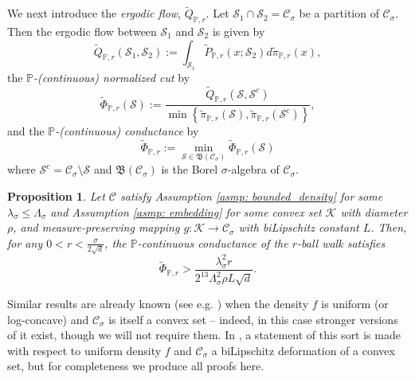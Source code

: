 \documentclass{article}
\newcommand{\set}[1]{\left\{#1\right\}}
\newcommand{\1}{\mathbf{1}}
\newcommand{\Pbb}{\mathbb{P}}
\newcommand{\Sset}{\mathcal{S}}
\newcommand{\Cset}{\mathcal{C}}
\newcommand{\Csig}{\Cset_{\sigma}}
\newcommand{\piwt}{\widetilde{\pi}}
\theoremstyle{aldenthm}
\newtheorem{proposition}{Proposition}
\theoremstyle{aldenrmrk}
\begin{document}
We next introduce the \emph{ergodic flow}, $\widetilde{Q}_{\Pbb,r}$. Let $\Sset_1 \cap \Sset_2 = \Csig$ be a partition of $\Csig$. Then the ergodic flow between $\Sset_1$ and $\Sset_2$ is given by 
\begin{equation*}
\widetilde{Q}_{\Pbb,r}(\Sset_1, \Sset_2) := \int_{\Sset_1} \widetilde{P}_{\Pbb,r}(x; \Sset_2) d\piwt_{\Pbb,r}(x), 
\end{equation*}
the \emph{$\Pbb$-(continuous) normalized cut} by
\begin{equation*}
\widetilde{\Phi}_{\Pbb,r}(\Sset) := \frac{\widetilde{Q}_{\Pbb,r}(\Sset, \Sset^c)}{\min \set{\piwt_{\Pbb,r}(\Sset),\piwt_{\Pbb,r}(\Sset^c)}},
\end{equation*}
and the \emph{$\Pbb$-(continuous) conductance} by
\begin{equation*}
\widetilde{\Phi}_{\Pbb,r} := \min_{\Sset \in \mathfrak{B}(\Csig)} \widetilde{\Phi}_{\Pbb,r}(\Sset)
\end{equation*}
where $\Sset^c = \Csig \setminus \Sset$ and $\mathfrak{B}(\Csig)$ is the Borel $\sigma$-algebra of $\Csig$. 

\begin{proposition}
	\label{prop: nonuniform_continuous_conductance}
	Let $\Cset$ satisfy Assumption \ref{asmp: bounded_density} for some $\lambda_{\sigma} \leq \Lambda_{\sigma}$ and Assumption \ref{asmp: embedding} for some convex set $\mathcal{K}$ with diameter $\rho$, and measure-preserving mapping $g: \mathcal{K} \to \Csig$ with biLipschitz constant $L$. Then, for any $0 < r < \frac{\sigma}{2\sqrt{d}}$, the $\Pbb$-continuous conductance of the $r$-ball walk satisfies
	\begin{equation*}
	\widetilde{\Phi}_{\Pbb,r} > \frac{\lambda_{\sigma}^2 r}{2^{13} \Lambda_{\sigma}^2 \rho L \sqrt{d}}.
	\end{equation*}
\end{proposition}

Similar results are already known (see e.g. \cite{kannan04}) when the density $f$ is uniform (or log-concave) and $\Csig$ is itself a convex set -- indeed, in this case stronger versions of it exist, though we will not require them. In \cite{abbasi-yadkori2016a}, a statement of this sort is made with respect to uniform density $f$ and $\Csig$ a biLipschitz deformation of a convex set, but for completeness we produce all proofs here.
\end{document}
